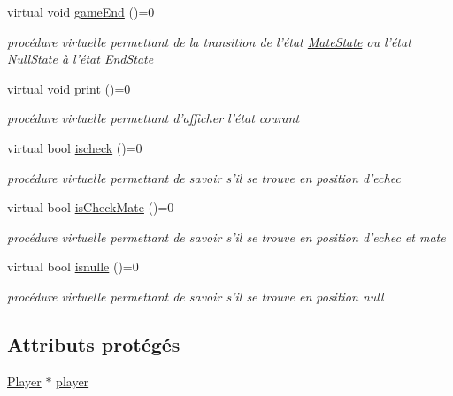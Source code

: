 \begin{DoxyCompactItemize}
virtual void \hyperlink{class_state_a5117e1f9bf06e17b4b0277838fe39bd8}{game\-End} ()=0
\begin{DoxyCompactList}\small\item\em procédure virtuelle permettant de la transition de l'état \hyperlink{class_mate_state}{Mate\-State} ou l'état \hyperlink{class_null_state}{Null\-State} à l'état \hyperlink{class_end_state}{End\-State} \end{DoxyCompactList}\item 
virtual void \hyperlink{class_state_a95a537bb55b9118b23d5bed88ba3b335}{print} ()=0
\begin{DoxyCompactList}\small\item\em procédure virtuelle permettant d'afficher l'état courant \end{DoxyCompactList}\item 
virtual bool \hyperlink{class_state_ad2d7084c507d8d20be2e772d953129fb}{ischeck} ()=0
\begin{DoxyCompactList}\small\item\em procédure virtuelle permettant de savoir s'il se trouve en position d'echec \end{DoxyCompactList}\item 
virtual bool \hyperlink{class_state_ac67ccfcdc2d3e9fbe6d05961416ffeda}{is\-Check\-Mate} ()=0
\begin{DoxyCompactList}\small\item\em procédure virtuelle permettant de savoir s'il se trouve en position d'echec et mate \end{DoxyCompactList}\item 
virtual bool \hyperlink{class_state_a869f2ebfad7e60719df5f89a613adee1}{isnulle} ()=0
\begin{DoxyCompactList}\small\item\em procédure virtuelle permettant de savoir s'il se trouve en position null \end{DoxyCompactList}\end{DoxyCompactItemize}
\subsection*{Attributs protégés}
\begin{DoxyCompactItemize}
\item 
\hyperlink{class_player}{Player} $\ast$ \hyperlink{class_state_a9a024fd38161f32fc10b68b4ccb13226}{player}
\end{DoxyCompactItemize}


